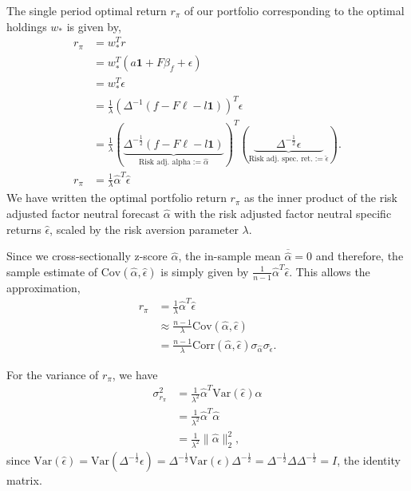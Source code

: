 \documentclass{amsart}
\theoremstyle{plain}
\numberwithin{equation}{section}
\begin{document}
The single period optimal return $r_{\pi}$ of our 
portfolio corresponding to the optimal holdings $w_{*}$
is given by,
\begin{align*}
r_{\pi} &= w_{*}^{T} r\\
&= w_{*}^{T}\left( a\mathbf{1} + F\beta_f + \epsilon\right)\\
&= w_{*}^{T}\epsilon\\
&=\frac{1}{\lambda} \left(\Delta^{-1} \left(f - F \boldsymbol{\ell} - l \mathbf{1}\right)\right)^{T}\epsilon\\
&=\frac{1}{\lambda} 
\left(\underbrace{\Delta^{-\frac{1}{2}}\left( f - F \boldsymbol{\ell} - l \mathbf{1}\right)}_
{\text{Risk adj. alpha} := \hat{\alpha}}\right)^{T}
\left(\underbrace{\qquad \Delta^{-\frac{1}{2}}\epsilon \qquad}_
{\text{Risk adj. spec. ret.} := \hat{\epsilon}}\right).\\
r_{\pi} &= \frac{1}{\lambda}\hat{\alpha}^{T} \hat{\epsilon}
\end{align*}
We have written the optimal portfolio return $r_{\pi}$ as 
the inner product of the risk adjusted factor neutral forecast $\hat{\alpha}$ 
with the risk adjusted factor neutral specific returns $\hat{\epsilon}$, scaled by the 
risk aversion parameter $\lambda$.  

Since we cross-sectionally z-score $\hat{\alpha}$, the in-sample mean 
$\overline{\hat{\alpha}} = 0$ and therefore, the sample
estimate of $\mathrm{Cov}(\hat{\alpha}, \hat{\epsilon
})$ is simply given by $\frac{1}{n-1} \hat{\alpha}^{T} \hat{\epsilon}$.
This allows the approximation,
\begin{align*}
r_{\pi} &= \frac{1}{\lambda}\hat{\alpha}^{T} \hat{\epsilon}\\
& \approx \frac{n-1}{\lambda} \mathrm{Cov}(\hat{\alpha}, \hat{\epsilon})\\
&= \frac{n-1}{\lambda} \mathrm{Corr}(\hat{\alpha}, \hat{\epsilon}) \sigma_{\hat{\alpha}} \sigma_{\hat{\epsilon}}.
\end{align*}

For the variance of $r_{\pi}$, we have
\begin{align*}
\sigma_{r_{\pi}}^2 &= \frac{1}{\lambda^2}\hat{\alpha}^{T} \mathrm{Var}(\hat{\epsilon}) \hat{\alpha}\\
&= \frac{1}{\lambda^2}\hat{\alpha}^{T} \hat{\alpha}\\
&= \frac{1}{\lambda^2}\|\hat{\alpha}\|_{2}^{2},
\end{align*}
since $\mathrm{Var}(\hat{\epsilon}) = \mathrm{Var}(\Delta^{-\frac{1}{2}}\epsilon)=\Delta^{-\frac{1}{2}}\mathrm{Var}(\epsilon)\Delta^{-\frac{1}{2}} = \Delta^{-\frac{1}{2}} \Delta \Delta^{-\frac{1}{2}} = I$,  the identity matrix.
\end{document}
